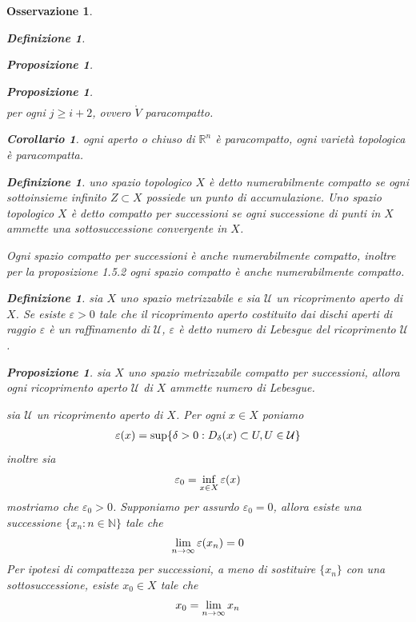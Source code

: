 \documentclass[oneside, 11pt]{amsbook}
\makeatletter
\newcommand{\0}{{(0)}}
\newcommand{\3}{{(3)}}
\theoremstyle{colonplain}
\newtheorem{prop}[thm]{Proposizione}
\newtheorem{cor}[thm]{Corollario}
\theoremstyle{colondefinition}
\newtheorem{defn}[thm]{Definizione}
\theoremstyle{colonremark}
\newtheorem{rmk}[thm]{Osservazione}
\numberwithin{equation}{chapter}
\renewcommand{\proofname}{Dimostrazione}
\renewenvironment{proof}[1][\proofname]{\par
  \pushQED{\end{proof}}%
  \normalfont \topsep6\p@\@plus6\p@\relax
  \trivlist
  \item[\hskip\labelsep\bfseries #1:]\ignorespaces
}{%
  \popQED\endtrivlist\@endpefalse
}
\makeatother
\begin{document}
\begin{rmk}
\begin{defn}
\begin{prop}
\begin{prop}
\begin{proof}
\begin{align}
\end{align}
per ogni $j \geq  i + 2$, ovvero $\mathring{V}$ paracompatto.
\end{proof}
\begin{cor}
ogni aperto o chiuso di $\mathbb{R}^n$ è paracompatto, ogni varietà topologica è paracompatta.
\end{cor}
\begin{defn}
uno spazio topologico $X$ è detto \textit{numerabilmente compatto} se ogni sottoinsieme infinito $Z \subset X$ possiede un punto di accumulazione. Uno spazio topologico $X$ è detto \textit{compatto per successioni} se ogni successione di punti in $X$ ammette una sottosuccessione convergente in $X$.
\end{defn}
Ogni spazio compatto per successioni è anche numerabilmente compatto, inoltre per la \textit{proposizione 1.5.2} ogni spazio compatto è anche numerabilmente compatto.
\begin{defn}
sia $X$ uno spazio metrizzabile e sia $\mathcal{U}$ un ricoprimento aperto di $X$. Se esiste $\varepsilon > 0$ tale che il ricoprimento aperto costituito dai dischi aperti di raggio $\varepsilon$ è un raffinamento di $\mathcal{U}$, $\varepsilon$ è detto numero di Lebesgue del ricoprimento $\mathcal{U}$.
\end{defn}
\begin{prop}
sia $X$ uno spazio metrizzabile compatto per successioni, allora ogni ricoprimento aperto $\mathcal{U}$ di $X$ ammette numero di Lebesgue.
\end{prop}
\begin{proof}
sia $\mathcal{U}$ un ricoprimento aperto di $X$. Per ogni $x \in X$ poniamo 
\begin{align}
    \varepsilon(x) = \sup\{\delta > 0 : D_\delta(x) \subset U, U \in \mathcal{U}\} \notag
\end{align}
inoltre sia 
\begin{align}
    \varepsilon_0 = \inf_{x \in X}\varepsilon(x) \notag
\end{align}
mostriamo che $\varepsilon_0 > 0$. Supponiamo per assurdo $\varepsilon_0 = 0$, allora esiste una successione $\{x_n : n  \in \mathbb{N}\}$ tale che 
\begin{align}
    \lim_{n \rightarrow \infty}\varepsilon(x_n) = 0 \notag
\end{align}
Per ipotesi di compattezza per successioni, a meno di sostituire $\{x_n\}$ con una sottosuccessione, esiste $x_0 \in X$ tale che 
\begin{align}
    x_0 = \lim_{n \rightarrow \infty}x_n \notag

\end{align}
\end{proof}
\end{prop}
\end{prop}
\end{defn}
\end{rmk}
\end{document}
